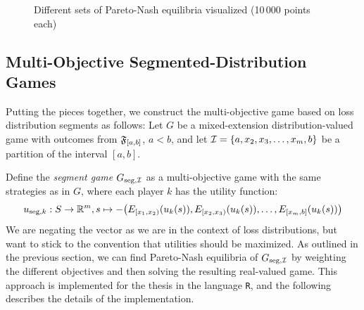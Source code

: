 \documentclass[a4paper]{scrreprt}
\theoremstyle{definition}
\begin{document}
\begin{figure}[h]
%        
%        
%        
        \caption{Different sets of Pareto-Nash equilibria visualized (10\,000 points each)}
        \label{fig:paretoNashEquilibriaShowcase}
    \end{figure}

    \subsection{Multi-Objective Segmented-Distribution Games}
    Putting the pieces together, we construct the multi-objective game based on loss distribution segments as follows:
    Let $G$ be a mixed-extension distribution-valued game with outcomes from $\mathfrak{F}_{[a, b]}$, $a < b$, and let $\mathcal{I} = \{a, x_2, x_3, \dots, x_m, b\}$ be a partition of the interval $[a, b]$.
    
    \newcommand{\Gseg}[1][]{G_{\text{seg,$\ifstrempty{#1}{\mathcal{I}}{#1}$}}}
    Define the \emph{segment game} $\Gseg$ as a multi-objective game with the same strategies as in $G$, where each player $k$ has the utility function:
    \begin{gather}
        u_{\text{seg}, k}: S \to \mathbb{R}^m, s \mapsto -\bigl(E_{[x_1, x_2)}(u_k(s)), E_{[x_2, x_3)}(u_k(s)), \dots, E_{[x_m, b]}(u_k(s))\bigr)
        \label{eq:segmentsExpectationVector}
    \end{gather}
    We are negating the vector as we are in the context of loss distributions, but want to stick to the convention that utilities should be maximized.
    As outlined in the previous section, we can find Pareto-Nash equilibria  of $\Gseg$ by weighting the different objectives and then solving the resulting real-valued game.
    This approach is implemented for the thesis in the language \texttt{R}, and the following describes the details of the implementation.
    
\end{document}
